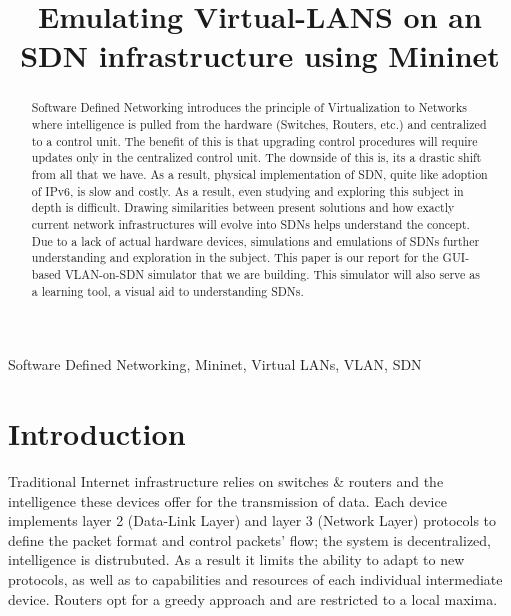 \documentclass[conference]{IEEEtran}
\begin{document}
\title{Emulating Virtual-LANS on an SDN infrastructure using Mininet}


\author{
\and
{}
\and
{}
}

\maketitle

\begin{abstract}
    Software Defined Networking introduces the principle of Virtualization to Networks where intelligence is pulled from the hardware (Switches, Routers, etc.) and centralized to a control unit. The benefit of this is that upgrading control procedures will require updates only in the centralized control unit. The downside of this is, its a drastic shift from all that we have. As a result, physical implementation of SDN, quite like adoption of IPv6, is slow and costly. As a result, even studying and exploring this subject in depth is difficult. Drawing similarities between present solutions and how exactly current network infrastructures will evolve into SDNs helps understand the concept. Due to a lack of actual hardware devices, simulations and emulations of SDNs further understanding and exploration in the subject. 
    This paper is our report for the GUI-based VLAN-on-SDN simulator that we are building. This simulator will also serve as a learning tool, a visual aid to understanding SDNs. 
\end{abstract}

\begin{IEEEkeywords}
Software Defined Networking, Mininet, Virtual LANs, VLAN, SDN
\end{IEEEkeywords}

\section{\textbf{Introduction}}
    Traditional Internet infrastructure relies on switches \& routers and the intelligence these devices offer for the transmission of data. Each device implements layer 2 (Data-Link Layer) and layer 3 (Network Layer) protocols to define the packet format and control packets' flow; the system is decentralized, intelligence is distrubuted. 
    As a result it limits the ability to adapt to new protocols, as well as to capabilities and resources of each individual intermediate device. Routers opt for a greedy approach and are restricted to a local maxima. 
    
\end{document}
